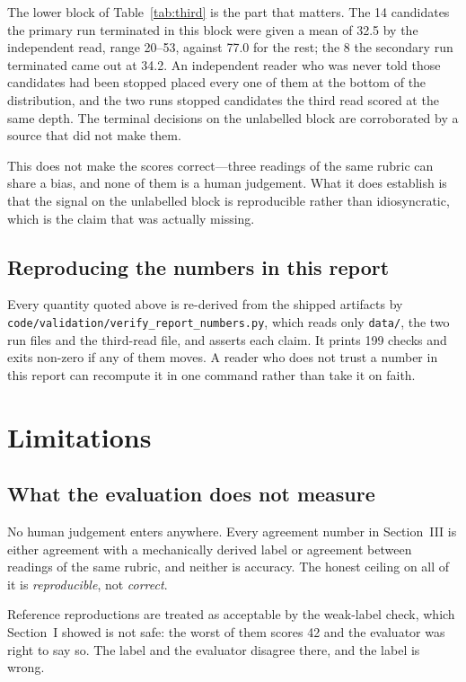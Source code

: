 \documentclass[conference]{IEEEtran}
\begin{document}
The lower block of Table~\ref{tab:third} is the part that matters. The
14 candidates the primary run terminated in this block were given a mean
of 32.5 by the independent read, range 20--53, against 77.0 for the
rest; the 8 the secondary run terminated came out at 34.2. An
independent reader who was never told those candidates had been stopped
placed every one of them at the bottom of the distribution, and the two
runs stopped candidates the third read scored at the same depth. The
terminal decisions on the unlabelled block are corroborated by a source
that did not make them.

This does not make the scores correct---three readings of the same
rubric can share a bias, and none of them is a human judgement. What it
does establish is that the signal on the unlabelled block is
reproducible rather than idiosyncratic, which is the claim that was
actually missing.

\subsection{Reproducing the numbers in this report}
Every quantity quoted above is re-derived from the shipped artifacts by
\texttt{code/valid\-ation/verify\_report\_numbers.py}, which reads only
\texttt{data/}, the two run files and the third-read file, and asserts
each claim. It prints 199 checks and exits non-zero if any of them moves.
A reader who does not trust a number in this report can recompute it in
one command rather than take it on faith.
\section{Limitations}

\subsection{What the evaluation does not measure}
No human judgement enters anywhere. Every agreement number in
Section~III is either agreement with a mechanically derived label or
agreement between readings of the same rubric, and neither is accuracy.
The honest ceiling on all of it is \emph{reproducible}, not
\emph{correct}.

Reference reproductions are treated as acceptable by the weak-label
check, which Section~I showed is not safe: the worst of them scores 42
and the evaluator was right to say so. The label and the evaluator
disagree there, and the label is wrong.
\end{document}

